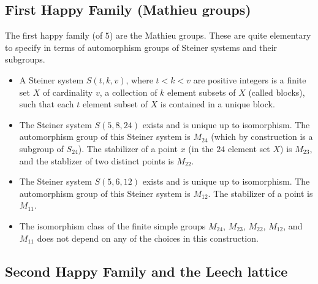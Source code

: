 \subsection{First Happy Family (Mathieu groups)}

The first happy family (of $5$) are the Mathieu groups.  These are quite
elementary to specify in terms of automorphism groups of Steiner
systems and their subgroups.

\begin{itemize}
\item A Steiner system $S(t,k,v)$, where $t < k < v$ are positive
  integers is a finite set $X$ of cardinality $v$, a collection of $k$
  element subsets of $X$ (called blocks), such that each $t$ element
  subset of $X$ is contained in a unique block.
\item The Steiner system $S(5,8,24)$ exists and is unique up to
  isomorphism.  The automorphism group of this Steiner system is
  $M_{24}$ (which by construction is a subgroup of $S_{24}$).  The
  stabilizer of a point $x$ (in the $24$ element set $X$) is $M_{23}$,
  and the stablizer of two distinct points is $M_{22}$.
\item The Steiner system $S(5,6,12)$ exists and is unique up to
  isomorphism.  The automorphism group of this Steiner system is
  $M_{12}$.  The stabilizer of a point is $M_{11}$.
\item The isomorphism class of the finite simple groups $M_{24}$,
  $M_{23}$, $M_{22}$, $M_{12}$, and $M_{11}$ does not depend on any of
  the choices in this construction.
\end{itemize}

\subsection{Second Happy Family and the Leech lattice}

